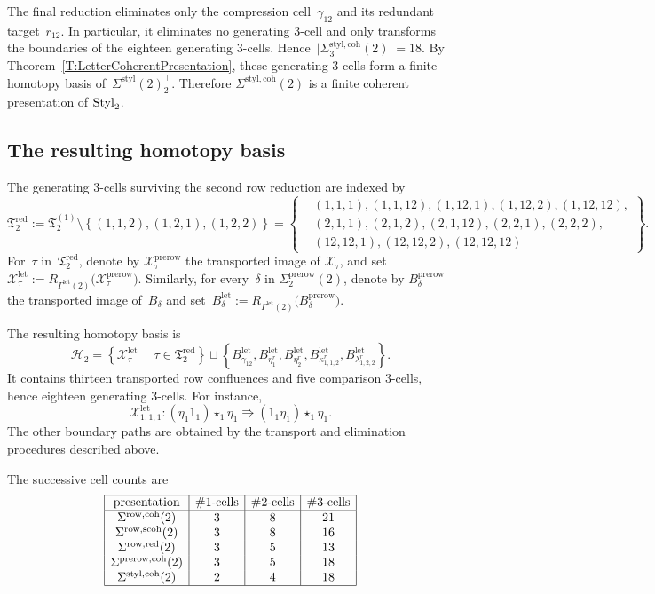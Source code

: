 \documentclass[a4paper, twoside, 11pt, english]{article}
\begin{document}
The final reduction eliminates only the compression
cell~$\gamma_{12}$ and its redundant target~$r_{12}$. In particular,
it eliminates no generating $3$-cell and only transforms the
boundaries of the eighteen generating $3$-cells. Hence~$\bigl|\Sigma^{\mathrm{styl,coh}}_3(2)\bigr|=18$.
By Theorem~\ref{T:LetterCoherentPresentation}, these generating
$3$-cells form a finite homotopy basis of~$\Sigma^{\mathrm{styl}}(2)_2^\top$. Therefore
$\Sigma^{\mathrm{styl,coh}}(2)$ is a finite coherent presentation of
$\mathrm{Styl}_2$.

\subsection{The resulting homotopy basis}

The generating $3$-cells surviving the second row reduction are indexed by
\[
\mathfrak T_2^{\mathrm{red}}
:=
\mathfrak T_2^{(1)}
\setminus
\left\{
(1,1,2),(1,2,1),(1,2,2)
\right\}
=
\left\{
\begin{aligned}
&(1,1,1),(1,1,12),(1,12,1),(1,12,2),(1,12,12),
\\
&(2,1,1),(2,1,2),(2,1,12),(2,2,1),(2,2,2),
\\
&(12,12,1),(12,12,2),(12,12,12)
\end{aligned}
\right\}.
\]
For~$\tau$ in~$\mathfrak T_2^{\mathrm{red}}$, denote by
$\mathcal X_\tau^{\mathrm{prerow}}$ the transported image of
$\mathcal X_\tau$, and set~$
\mathcal X_\tau^{\mathrm{let}}
:=
R_{\Gamma^{\mathrm{let}}(2)}
\bigl(
\mathcal X_\tau^{\mathrm{prerow}}
\bigr)$.
Similarly, for every~$\delta$ in
$\Sigma^{\mathrm{prerow}}_2(2)$, denote by
$B_\delta^{\mathrm{prerow}}$ the transported image of~$B_\delta$ and
set~$
B_\delta^{\mathrm{let}}
:=
R_{\Gamma^{\mathrm{let}}(2)}
\bigl(
B_\delta^{\mathrm{prerow}}
\bigr)$.

The resulting homotopy basis is
\[
\mathcal H_2
={}
\left\{
\mathcal X_\tau^{\mathrm{let}}
\ \middle|\
\tau\in\mathfrak T_2^{\mathrm{red}}
\right\}
\sqcup
\left\{
B_{\gamma_{12}}^{\mathrm{let}},
B_{\eta_1^r}^{\mathrm{let}},
B_{\eta_2^r}^{\mathrm{let}},
B_{\kappa_{1,1,2}^r}^{\mathrm{let}},
B_{\lambda_{1,2,2}^r}^{\mathrm{let}}
\right\}.
\]
It contains thirteen transported row confluences and five comparison
$3$-cells, hence eighteen generating $3$-cells.
For instance,
\[
\mathcal X_{1,1,1}^{\mathrm{let}}
\colon
(\eta_1 1_1)\star_1\eta_1
\Rrightarrow
(1_1\eta_1)\star_1\eta_1.
\]
The other boundary paths are obtained by the transport and elimination
procedures described above. 

The successive cell counts are
\[
\begin{array}{|c|c|c|c|}
\hline
\text{presentation}
& \#1\text{-cells}
& \#2\text{-cells}
& \#3\text{-cells}
\\ \hline
\Sigma^{\mathrm{row,coh}}(2)
&3&8&21\\
\Sigma^{\mathrm{row,scoh}}(2)
&3&8&16\\
\Sigma^{\mathrm{row,red}}(2)
&3&5&13\\
\Sigma^{\mathrm{prerow,coh}}(2)
&3&5&18\\
\Sigma^{\mathrm{styl,coh}}(2)
&2&4&18\\ \hline
\end{array}
\]
\end{document}
